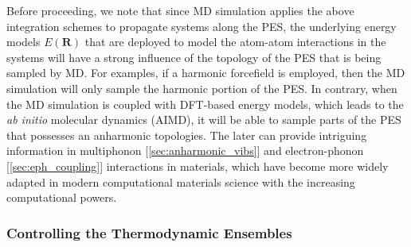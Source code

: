Before proceeding, we note that since MD simulation applies the above integration schemes to propagate systems along the PES, the underlying energy models $E(\bm{R})$ that are deployed to model the atom-atom interactions in the systems will have a strong influence of the topology of the PES that is being sampled by MD. For examples, if a harmonic forcefield is employed, then the MD simulation will only sample the harmonic portion of the PES. In contrary, when the MD simulation is coupled with DFT-based energy models, which leads to the \emph{ab initio} molecular dynamics (AIMD), it will be able to sample parts of the PES that possesses an anharmonic topologies. The later can provide intriguing information in multiphonon [\cref{sec:anharmonic_vibs}] and electron-phonon [\cref{sec:eph_coupling}] interactions in materials, which have become more widely adapted in modern computational materials science with the increasing computational powers.

\subsubsection{Controlling the Thermodynamic Ensembles}

